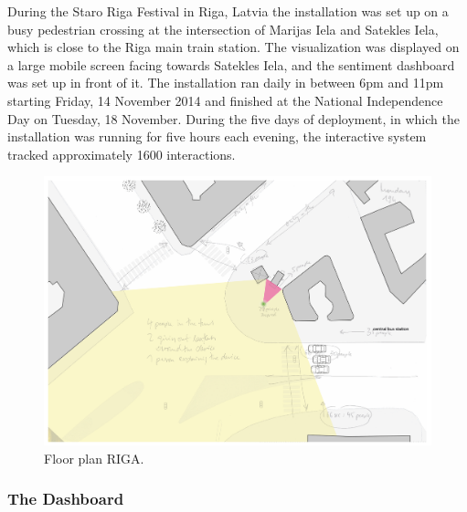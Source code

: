 During the Staro Riga Festival in Riga, Latvia the installation was set up on a busy pedestrian crossing at the intersection of Marijas Iela and Satekles Iela, which is close to the Riga main train station. The visualization was displayed on a large mobile screen facing towards Satekles Iela, and the sentiment dashboard was set up in front of it. The installation ran daily in between 6pm and 11pm starting Friday, 14 November 2014 and finished at the National Independence Day on Tuesday, 18 November. During the five days of deployment, in which the installation was running for five hours each evening, the interactive system tracked approximately 1600 interactions.

\begin{figure}[!h] 
\centering
\includegraphics[width=\textwidth]{Illustrations/RIGA_floorplan.png}
\caption [Floor plan RIGA] {Floor plan RIGA.}
\label{RIGAfloorplan}
\end{figure}

\subsubsection{The Dashboard}

